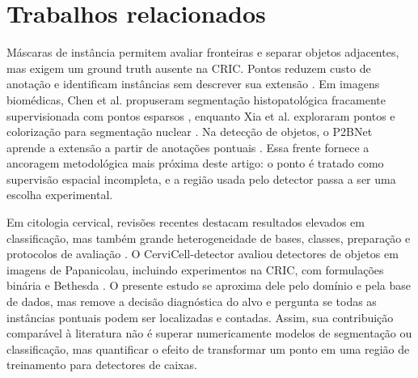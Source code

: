 \FloatBarrier
\section{Trabalhos relacionados}

M\'ascaras de inst\^ancia permitem avaliar fronteiras e separar objetos
adjacentes, mas exigem um ground truth ausente na CRIC. Pontos reduzem custo de
anota\c{c}\~ao e identificam inst\^ancias sem descrever sua extens\~ao
\cite{chen2021sparsepoints,xia2023colorization,chen2023p2bnet}. Em imagens
biom\'edicas, Chen et al. propuseram segmenta\c{c}\~ao histopatol\'ogica fracamente
supervisionada com pontos esparsos \cite{chen2021sparsepoints}, enquanto Xia et
al. exploraram pontos e coloriza\c{c}\~ao para segmenta\c{c}\~ao nuclear
\cite{xia2023colorization}. Na detec\c{c}\~ao de objetos, o P2BNet aprende a
extens\~ao a partir de anota\c{c}\~oes pontuais \cite{chen2023p2bnet}. Essa frente
fornece a ancoragem metodol\'ogica mais pr\'oxima deste artigo: o ponto \'e tratado
como supervis\~ao espacial incompleta, e a regi\~ao usada pelo detector passa a ser
uma escolha experimental.

Em citologia cervical, revis\~oes recentes destacam resultados elevados em
classifica\c{c}\~ao, mas tamb\'em grande heterogeneidade de bases, classes,
prepara\c{c}\~ao e protocolos de avalia\c{c}\~ao \cite{jiang2023systematic}. O
CerviCell-detector avaliou detectores de objetos em imagens de Papanicolau,
incluindo experimentos na CRIC, com formula\c{c}\~oes bin\'aria e Bethesda
\cite{kalbhor2023cervicell}. O presente estudo se aproxima dele pelo dom\'inio e
pela base de dados, mas remove a decis\~ao diagn\'ostica do alvo e pergunta se
todas as inst\^ancias pontuais podem ser localizadas e contadas. Assim, sua
contribui\c{c}\~ao compar\'avel \`a literatura n\~ao \'e superar numericamente
modelos de segmenta\c{c}\~ao ou classifica\c{c}\~ao, mas quantificar o efeito de
transformar um ponto em uma regi\~ao de treinamento para detectores de caixas.
